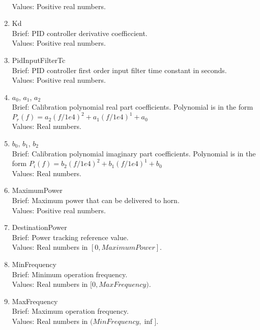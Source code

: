 \documentclass{article}
\begin{document}
\begin{enumerate}
            \\ Values: Positive real numbers.
      \item Kd
            \\ Brief: PID controller derivative coefficcient.
            \\ Values: Positive real numbers.
      \item PidInputFilterTc
            \\ Brief: PID controller first order input filter time constant in seconds.
            \\ Values: Positive real numbers.
      \item $a_0$, $a_1$, $a_2$
            \\ Brief: Calibration polynomial real part coefficients. Polynomial is in the form 
            $P_r(f) = a_2 (f/1e4)^2 + a_1 (f/1e4)^1 + a_0$
            \\ Values: Real numbers.
      \item $b_0$, $b_1$, $b_2$
            \\ Brief: Calibration polynomial imaginary part coefficients. Polynomial is in the form 
            $P_i(f) = b_2 (f/1e4)^2 + b_1 (f/1e4)^1 + b_0$
            \\ Values: Real numbers.
      \item MaximumPower
            \\ Brief: Maximum power that can be delivered to horn.
            \\ Values: Positive real numbers.
      \item DestinationPower
            \\ Brief: Power tracking reference value.
            \\ Values: Real numbers in $[0, MaximumPower]$.
      \item MinFrequency
            \\ Brief: Minimum operation frequency.
            \\ Values: Real numbers in $[0, MaxFrequency)$.
      \item MaxFrequency
            \\ Brief: Maximum operation frequency.
            \\ Values: Real numbers in $(MinFrequency, \inf]$.
\end{enumerate}
\end{document}
